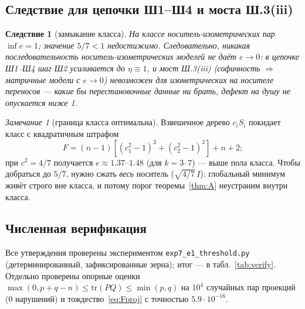 \documentclass[11pt,a4paper]{article}
\newtheorem{corollary}[theorem]{Следствие}
\theoremstyle{definition}
\theoremstyle{remark}
\newtheorem{remark}[theorem]{Замечание}
\begin{document}
\subsection{Следствие для цепочки Ш1--Ш4 и моста Ш.3(iii)}

\begin{corollary}[замыкание класса]\label{cor:D}
На классе носитель-изометрических пар $\inf e = 1$; значение $5/7 < 1$
недостижимо. Следовательно, никакая последовательность носитель-изометрических
моделей не даёт $e \to 0$: в цепочке Ш1--Ш4 шаг Ш2 усиливается до
$\eta \equiv 1$, и мост Ш.3(iii) (софичность $\Rightarrow$ матричные модели
с $e \to 0$) невозможен для изометрических на носителе переносов --- какие бы
перестановочные данные ни брать, дефект на душу не опускается ниже 1.
\end{corollary}

\begin{remark}[граница класса оптимальна]
Взвешенное дерево $c_iS_i$ покидает класс с квадратичным штрафом
\begin{equation}\label{eq:weightedtree}
F = (n-1)[(c_1^2{-}1)^2 + (c_2^2{-}1)^2] + n + 2;
\end{equation}
при $c^2 = 4/7$
получается $e \approx 1.37$--$1.48$ (для $k = 3$--$7$) --- выше пола класса.
Чтобы добраться до $5/7$, нужно сжать \emph{весь} носитель
($\sqrt{4/7}\,I$): глобальный минимум живёт строго вне класса, и потому
порог теоремы~\ref{thm:A} неустраним внутри класса.
\end{remark}

\subsection{Численная верификация}

Все утверждения проверены экспериментом \texttt{exp7\_e1\_threshold.py}
(детерминированный, зафиксированные зерна); итог --- в
табл.~\ref{tab:verify}. Отдельно проверены опорные оценки
$\max(0, p+q-n) \le \mathrm{tr}(PQ) \le \min(p,q)$ на $10^4$ случайных пар
проекций (0 нарушений) и тождество~\eqref{eq:Fproj} с точностью
$5.9\cdot 10^{-16}$.
\end{document}

